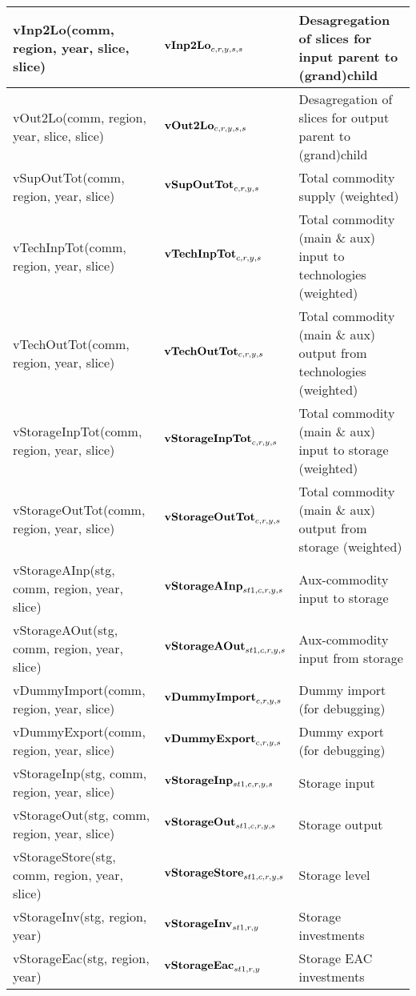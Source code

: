 \documentclass{article}
\begin{document}
\begin{longtable}{|p{10cm}|p{5cm}|p{9cm}|}
 \hline
vInp2Lo(comm, region, year, slice, slice) & ${\bf vInp2Lo}_{c,r,y,s,s}$ & Desagregation of slices for input parent to (grand)child \\
 \hline
vOut2Lo(comm, region, year, slice, slice) & ${\bf vOut2Lo}_{c,r,y,s,s}$ & Desagregation of slices for output parent to (grand)child \\
 \hline
vSupOutTot(comm, region, year, slice) & ${\bf vSupOutTot}_{c,r,y,s}$ & Total commodity supply (weighted) \\
 \hline
vTechInpTot(comm, region, year, slice) & ${\bf vTechInpTot}_{c,r,y,s}$ & Total commodity (main \& aux) input to technologies (weighted) \\
 \hline
vTechOutTot(comm, region, year, slice) & ${\bf vTechOutTot}_{c,r,y,s}$ & Total commodity (main \& aux) output from technologies (weighted) \\
 \hline
vStorageInpTot(comm, region, year, slice) & ${\bf vStorageInpTot}_{c,r,y,s}$ & Total commodity (main \& aux) input to storage (weighted) \\
 \hline
vStorageOutTot(comm, region, year, slice) & ${\bf vStorageOutTot}_{c,r,y,s}$ & Total commodity (main \& aux) output from storage (weighted) \\
 \hline
vStorageAInp(stg, comm, region, year, slice) & ${\bf vStorageAInp}_{st1,c,r,y,s}$ & Aux-commodity input to storage \\
 \hline
vStorageAOut(stg, comm, region, year, slice) & ${\bf vStorageAOut}_{st1,c,r,y,s}$ & Aux-commodity input from storage \\
 \hline
vDummyImport(comm, region, year, slice) & ${\bf vDummyImport}_{c,r,y,s}$ & Dummy import (for debugging) \\
 \hline
vDummyExport(comm, region, year, slice) & ${\bf vDummyExport}_{c,r,y,s}$ & Dummy export (for debugging) \\
 \hline
vStorageInp(stg, comm, region, year, slice) & ${\bf vStorageInp}_{st1,c,r,y,s}$ & Storage input \\
 \hline
vStorageOut(stg, comm, region, year, slice) & ${\bf vStorageOut}_{st1,c,r,y,s}$ & Storage output \\
 \hline
vStorageStore(stg, comm, region, year, slice) & ${\bf vStorageStore}_{st1,c,r,y,s}$ & Storage level \\
 \hline
vStorageInv(stg, region, year) & ${\bf vStorageInv}_{st1,r,y}$ & Storage investments \\
 \hline
vStorageEac(stg, region, year) & ${\bf vStorageEac}_{st1,r,y}$ & Storage EAC investments \\

\end{longtable}
\end{document}
